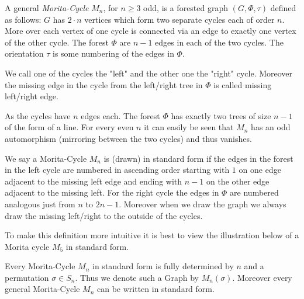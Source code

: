 \begin{definition}
	 A general \emph{Morita-Cycle} $M_{n}$, for $n \geq 3$ odd, is a forested graph $(G,\Phi,\tau)$ defined as follows:
	 $G$ has $2\cdot n$ vertices which form two separate cycles each of order $n$.
	 More over each vertex of one cycle is connected via an edge to exactly one vertex of the other cycle.
	 The forest $\Phi$ are $n-1$ edges in each of the two cycles.
	 The orientation $\tau$ is some numbering of the edges in $\Phi$. 

	 We call one of the cycles the "left" and the other one the "right" cycle.
	 Moreover the missing edge in the cycle from the left/right tree in $\Phi$ is called missing left/right edge.
\end{definition}
As the cycles have $n$ edges each. The forest $\Phi$ has exactly two trees of size $n-1$ of the form of a line.
For every even $n$ it can easily be seen that $M_{n}$ has an odd automorphism (mirroring between the two cycles) and thus vanishes.

\begin{definition}
	We say a Morita-Cycle $M_{n}$ is (drawn) in standard form if the edges in the forest in the left cycle are numbered in ascending order
	starting with $1$ on one edge adjacent to the missing left edge and ending with $n-1$ on the other edge adjacent to the missing left.
	For the right cycle the edges in $\Phi$ are numbered analogous just from $n$ to $2n-1$. 
	Moreover when we draw the graph we always draw the missing left/right to the outside of the cycles.

	To make this definition more intuitive it is best to view the illustration below of a Morita cycle $M_{5}$ in standard form.
\end{definition}

\begin{proposition}
	Every Morita-Cycle $M_{n}$ in standard form is fully determined by $n$ and a permutation $\sigma \in S_{n}$. Thus we denote 
	such a Graph by $M_{n}(\sigma)$.
	Moreover every general Morita-Cycle $M_{n}$ can be written in standard form.
\end{proposition}

